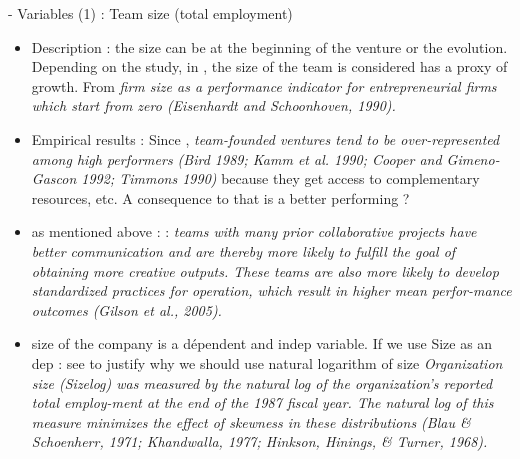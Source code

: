 \begin{itemize}
\begin{itemize}
- Variables (1) : Team size (total employment)
\begin{itemize}
  \item Description : the size can be at the beginning of the venture or the evolution. Depending on the study, in \citep{davila2003venture}, the size of the team is considered has a proxy of growth. From \citep{unger2011human} \textit{firm size as a performance indicator for entrepreneurial firms which start from zero (Eisenhardt and Schoonhoven, 1990).}
  \item Empirical results : Since \citep{steffens2012birds}, \textit{team-founded ventures tend to be over-represented among high performers (Bird 1989; Kamm et al. 1990; Cooper and Gimeno-Gascon 1992; Timmons 1990)} because they get access to complementary resources, etc. A consequence to that is a better performing ?
  \item as mentioned above : \citet{taylor2006superman} : \textit{teams with many prior collaborative projects have better communication and are thereby more likely to fulfill the goal of obtaining more creative outputs. These teams are also more likely to develop standardized practices for operation, which result in higher mean perfor-mance outcomes (Gilson et al., 2005).}
  \item size of the company is a dépendent and indep variable. If we use Size as an dep : see \citet{hanks1994tightening}  to justify why we should use natural logarithm of size \textit{Organization size (Sizelog) was measured by the natural log of the organization's reported total employ-ment at the end of the 1987 fiscal year. The natural log of this measure minimizes the effect of skewness in these distributions (Blau & Schoenherr, 1971; Khandwalla, 1977; Hinkson, Hinings, & Turner, 1968).}
\end{itemize}


\end{itemize}
\end{itemize}
